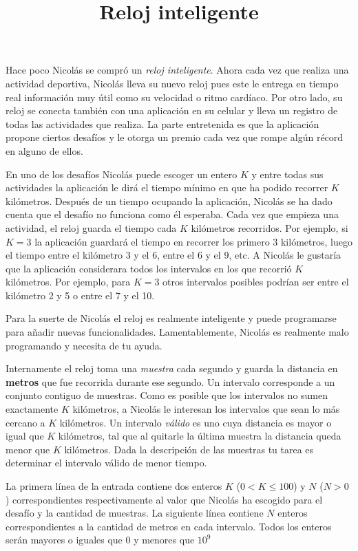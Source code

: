 \documentclass{oci}
\title{Reloj inteligente}
\begin{document}
\begin{problemDescription}
  Hace poco Nicolás se compró un \emph{reloj inteligente}.
  Ahora cada vez que realiza una actividad deportiva, Nicolás lleva su nuevo
  reloj pues este le entrega en tiempo real información muy útil como su
  velocidad o ritmo cardíaco.
  Por otro lado, su reloj se conecta también con una aplicación en su celular y
  lleva un registro de todas las actividades que realiza.
  La parte entretenida es que la aplicación propone ciertos desafíos y le otorga
  un premio cada vez que rompe algún récord en alguno de ellos.

  En uno de los desafíos Nicolás puede escoger un entero $K$ y entre todas sus
  actividades la aplicación le dirá el tiempo mínimo en que ha podido recorrer
  $K$ kilómetros.
  Después de un tiempo ocupando la aplicación, Nicolás se ha dado cuenta que el
  desafío no funciona como él esperaba.
  Cada vez que empieza una actividad, el reloj guarda el tiempo cada $K$
  kilómetros recorridos.
  Por ejemplo, si $K=3$ la aplicación guardará el tiempo en
  recorrer los primero 3 kilómetros, luego el tiempo entre el kilómetro 3 y
  el 6, entre el 6 y el 9, etc.
  A Nicolás le gustaría que la aplicación considerara todos los intervalos en
  los que recorrió $K$ kilómetros.
  Por ejemplo, para $K=3$ otros intervalos posibles podrían ser entre el
  kilómetro 2 y 5 o entre el 7 y el 10.

  Para la suerte de Nicolás el reloj es realmente inteligente y puede
  programarse para añadir nuevas funcionalidades.
  Lamentablemente, Nicolás es realmente malo programando y necesita de tu ayuda.

  Internamente el reloj toma una \emph{muestra} cada segundo y guarda la
  distancia en \textbf{metros} que fue recorrida durante ese segundo.
  Un intervalo corresponde a un conjunto contiguo de muestras.
  Como es posible que los intervalos no sumen exactamente $K$ kilómetros, a
  Nicolás le interesan los intervalos que sean lo más cercano a $K$ kilómetros.
  Un intervalo \emph{válido} es uno cuya distancia es mayor o igual que $K$ kilómetros,
  tal que al quitarle la última muestra la distancia queda menor que $K$ kilómetros.
  Dada la descripción de las muestras tu tarea es determinar el intervalo
  válido de menor tiempo.

\end{problemDescription}

\begin{inputDescription}
  La primera línea de la entrada contiene dos enteros $K$ ($0<K\leq 100$) y $N$
  ($N > 0$) correspondientes respectivamente al valor que Nicolás ha escogido
  para el desafío y la cantidad de muestras.
  La siguiente línea contiene $N$ enteros correspondientes a la cantidad de
  metros en cada intervalo.
  Todos los enteros serán mayores o iguales que 0 y menores que $10^9$
\end{inputDescription}
\end{document}
